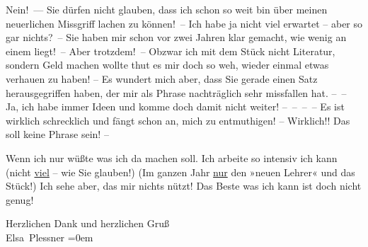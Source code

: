\pstart
           Nein! — Sie dürfen nicht glauben, dass ich schon so weit bin über meinen neuerlichen
               Missgriff lachen zu können! – Ich habe ja nicht {\pb}viel erwartet – aber so
               gar nichts? – Sie haben mir schon vor zwei Jahren klar gemacht, wie
               wenig an einem \label{K_L03722-3v}\label{K_L03722-3} liegt! – Aber trotzdem! – Obzwar ich mit
               dem Stück nicht Literatur,
               sondern Geld machen wollte thut es mir doch so weh, wieder einmal etwas verhauen zu
               haben! – Es wundert mich aber, dass Sie gerade einen Satz herausgegriffen haben, der
               mir als Phrase nachträglich sehr missfallen hat. – – Ja, ich habe immer Ideen und
               komme doch damit nicht weiter! – – – – Es ist wirk{\pb}lich schrecklich und
               fängt schon an, mich zu entmuthigen! – Wirklich!! Das soll keine Phrase sein! –\pend
           
\pstart
           Wenn ich nur wüßte was ich da machen soll. Ich arbeite so intensiv ich kann (nicht
                  \uline{viel} – wie Sie glauben!) (Im ganzen Jahr \uline{nur} den »neuen
                     Lehrer« und das Stück!) Ich sehe aber, das mir nichts nützt! Das Beste was ich kann ist doch
               nicht genug!\pend
           
\pstart
           Herzlichen Dank und herzlichen Gruß{\\[\baselineskip]}\spacefill\mbox{Elsa Plessner}\pend
           \leftskip=0em{}\endnumbering{}
\begin{anhang}
\end{anhang}
      